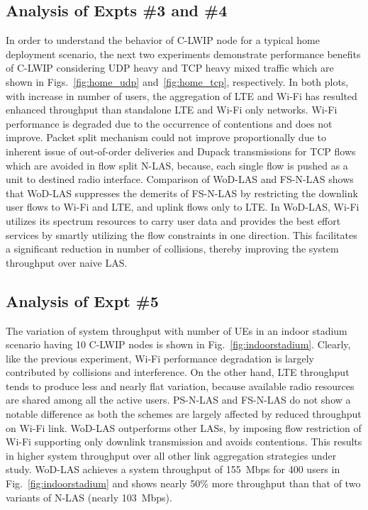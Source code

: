 \documentclass[conference]{IEEEtran}
\begin{document}
\subsection{Analysis of Expts \#3 and \#4}In order to understand the behavior of C-LWIP node for a typical home deployment scenario, the next two experiments demonstrate performance benefits of C-LWIP considering UDP heavy and TCP heavy mixed traffic which are shown in Figs.~\ref{fig:home_udp} and~\ref{fig:home_tcp}, respectively. In both plots, with increase in number of users, the aggregation of LTE and Wi-Fi has resulted enhanced throughput than standalone LTE and Wi-Fi only networks. Wi-Fi performance is degraded due to the occurrence of contentions and does not improve. Packet split mechanism could not improve proportionally due to inherent issue of out-of-order deliveries and Dupack transmissions for TCP flows which are avoided in flow split N-LAS, because, each single flow is pushed as a unit to destined radio interface. Comparison of WoD-LAS and FS-N-LAS shows that WoD-LAS suppresses the demerits of FS-N-LAS by restricting the downlink user flows to Wi-Fi and LTE, and uplink flows only to LTE. In WoD-LAS, Wi-Fi utilizes its spectrum resources to carry user data and provides the best effort services by smartly utilizing the flow constraints in one direction. This facilitates a significant reduction in number of collisions, thereby improving the system throughput over naive LAS.

\subsection{Analysis of Expt \#5}The variation of system throughput with number of UEs in an indoor stadium scenario having 10 C-LWIP nodes is shown in Fig.~\ref{fig:indoorstadium}. Clearly, like the previous experiment, Wi-Fi performance degradation is largely contributed by collisions and interference. On the other hand, LTE throughput tends to produce less and nearly flat variation, because available radio resources are shared among all the active users. PS-N-LAS and FS-N-LAS do not show a notable difference as both the schemes are largely affected by reduced throughput on Wi-Fi link. WoD-LAS outperforms other LASs, by imposing flow restriction of Wi-Fi supporting only downlink transmission and avoids contentions. This results in higher system throughput over all other link aggregation strategies under study. WoD-LAS achieves a system throughput of 155~Mbps for 400 users in Fig.~\ref{fig:indoorstadium} and shows nearly 50\% more throughput than that of two variants of N-LAS (nearly 103~Mbps).  
\end{document}
